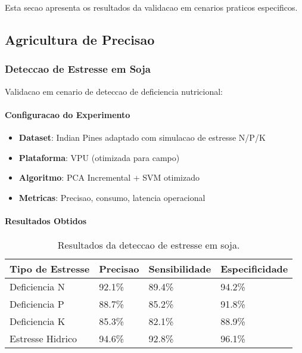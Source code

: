 Esta secao apresenta os resultados da validacao em cenarios praticos especificos.

\subsection{Agricultura de Precisao}

\subsubsection{Deteccao de Estresse em Soja}
Validacao em cenario de deteccao de deficiencia nutricional:

\paragraph{Configuracao do Experimento}
\begin{itemize}
    \item \textbf{Dataset}: Indian Pines adaptado com simulacao de estresse N/P/K
    \item \textbf{Plataforma}: VPU (otimizada para campo)
    \item \textbf{Algoritmo}: PCA Incremental + SVM otimizado
    \item \textbf{Metricas}: Precisao, consumo, latencia operacional
\end{itemize}

\paragraph{Resultados Obtidos}
\begin{table}[!htp]
\caption[Deteccao de Estresse]{Resultados da deteccao de estresse em soja.}
\label{tab:estresse_soja}
\begin{center}
\begin{tabular}{|p{3cm}|p{2cm}|p{2cm}|p{2cm}|}
\hline
\textbf{Tipo de Estresse} & \textbf{Precisao} & \textbf{Sensibilidade} & \textbf{Especificidade} \\
\hline
Deficiencia N & 92.1\% & 89.4\% & 94.2\% \\
\hline
Deficiencia P & 88.7\% & 85.2\% & 91.8\% \\
\hline
Deficiencia K & 85.3\% & 82.1\% & 88.9\% \\
\hline
Estresse Hidrico & 94.6\% & 92.8\% & 96.1\% \\
\hline
\end{tabular}
\end{center}
\end{table}

